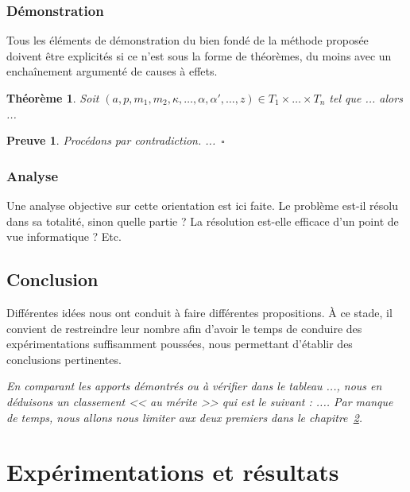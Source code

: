 \documentclass[11pt, french]{report-rd-info}
\newtheorem{theoreme}{Théorème}
\newtheorem{preuve}{Preuve}
\begin{document}
\subsection{Démonstration}

Tous les éléments de démonstration du bien fondé de la méthode proposée doivent être explicités si ce n'est sous la forme de théorèmes, du moins avec un enchaînement argumenté de causes à effets.

\begin{theoreme}
	Soit $(a, p, m_1, m_2, \kappa, \ldots, \alpha, \alpha', \ldots,z) \in T_1 \times \ldots \times T_n$ tel que ... alors ...
\end{theoreme}

\begin{preuve}
	Procédons par contradiction. ...~\hfill$\square$
\end{preuve}

\subsection{Analyse}

Une analyse objective sur cette orientation est ici faite. Le problème est-il résolu dans sa totalité, sinon quelle partie ? La résolution est-elle efficace d'un point de vue informatique ? Etc.

\section{Conclusion}

Différentes idées nous ont conduit à faire différentes propositions. À ce stade, il convient de restreindre leur nombre afin d'avoir le temps de conduire des expérimentations suffisamment poussées, nous permettant d'établir des conclusions pertinentes.

\emph{En comparant les apports démontrés ou à vérifier dans le tableau ..., nous en déduisons un classement << au mérite >> qui est le suivant : .... Par manque de temps, nous allons nous limiter aux deux premiers dans le chapitre~\ref{chap:Experimentations}.}


\chapter{Expérimentations et résultats}
\label{chap:Experimentations}
\end{document}
